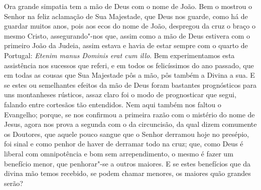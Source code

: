 Ora grande simpatia tem a mão de Deus com o nome de João. Bem o mostrou
o Senhor na feliz aclamação de Sua Majestade, que Deus nos guarde, como
há de guardar muitos anos, pois aos ecos do nome de João, despregou da
cruz o braço o mesmo Cristo, assegurando"-nos que, assim como a mão de
Deus estivera com o primeiro João da Judeia, assim estava e havia de
estar sempre com o quarto de Portugal: \emph{Etenim manus Dominis erat
cum illo}. Bem experimentamos esta assistência nos sucessos que referi,
e em todos os felicíssimos do ano passado, que em todas as cousas que
Sua Majestade pôs a mão, pôs também a Divina a sua. E se estes ou
semelhantes efeitos da mão de Deus foram bastantes prognósticos para uns
montanheses rústicos, assaz claro foi o modo de prognosticar que segui,
falando entre cortesãos tão entendidos. Nem aqui também nos faltou o
Evangelho; porque, se nos confirmou a primeira razão com o mistério do
nome de Jesus, agora nos prova a segunda com o da circuncisão, da qual
dizem comumente os Doutores, que aquele pouco sangue que o Senhor
derramou hoje no presépio, foi sinal e como penhor de haver de derramar
todo na cruz; que, como Deus é liberal com omnipotência e bom sem
arrependimento, o mesmo é fazer um benefício menor, que penhorar"-se a
outros maiores. E se estes benefícios que da divina mão temos recebido,
se podem chamar menores, os maiores quão grandes serão?

